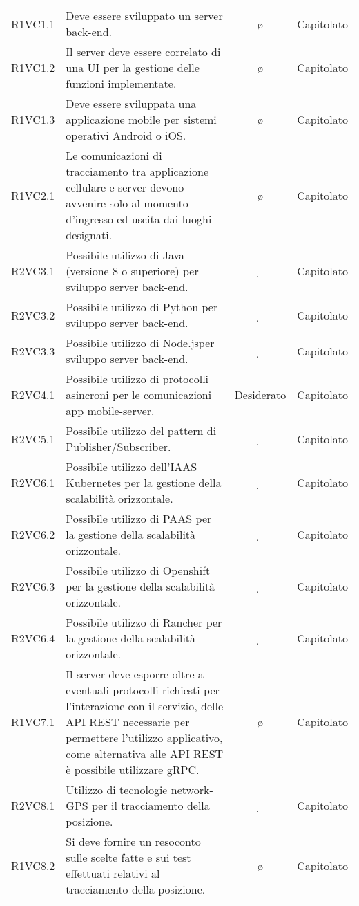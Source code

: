 {\begin{longtable}{ c C{8cm} c c}
R1VC1.1 & Deve essere sviluppato un server back-end. & \o & Capitolato \\
R1VC1.2 & Il server deve essere correlato di una UI per la gestione delle funzioni implementate. & \o & Capitolato \\
R1VC1.3 & Deve essere sviluppata una applicazione mobile per sistemi operativi Android o iOS. & \o & Capitolato \\
R1VC2.1 & Le comunicazioni di tracciamento tra applicazione cellulare e server devono avvenire solo al momento d’ingresso ed uscita dai luoghi designati. & \o & Capitolato \\
R2VC3.1 & Possibile utilizzo di Java (versione 8 o superiore) per sviluppo server back-end. & \d & Capitolato \\
R2VC3.2 & Possibile utilizzo di Python per sviluppo server back-end. & \d & Capitolato \\
R2VC3.3 & Possibile utilizzo di Node.jsper sviluppo server back-end. & \d & Capitolato \\
R2VC4.1 & Possibile utilizzo di protocolli asincroni per le comunicazioni app mobile-server. & Desiderato & Capitolato \\
R2VC5.1 & Possibile utilizzo del pattern di Publisher/Subscriber. & \d & Capitolato \\
R2VC6.1 & Possibile utilizzo dell’IAAS Kubernetes per la gestione della scalabilità orizzontale. & \d & Capitolato \\
R2VC6.2 & Possibile utilizzo di PAAS per la gestione della scalabilità orizzontale. & \d & Capitolato \\
R2VC6.3 & Possibile utilizzo di Openshift per la gestione della scalabilità orizzontale. & \d & Capitolato \\
R2VC6.4 & Possibile utilizzo di Rancher per la gestione della scalabilità orizzontale. & \d & Capitolato \\
R1VC7.1 & Il server deve esporre oltre a eventuali protocolli richiesti per l’interazione con il servizio, delle API REST necessarie per permettere l’utilizzo applicativo, come alternativa alle API REST è possibile utilizzare gRPC. & \o & Capitolato \\
R2VC8.1 & Utilizzo di tecnologie network-GPS per il tracciamento della posizione. & \d & Capitolato \\
R1VC8.2 & Si deve fornire un resoconto sulle scelte fatte e sui test effettuati relativi al tracciamento della posizione. & \o & Capitolato \\

\end{longtable}}
